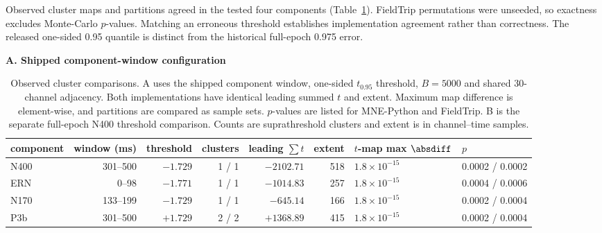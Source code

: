 Observed cluster maps and partitions agreed in the tested four components (Table~\ref*{tab:cluster}). FieldTrip permutations were unseeded, so exactness excludes Monte-Carlo \(p\)-values. Matching an erroneous threshold establishes implementation agreement rather than correctness. The released one-sided 0.95 quantile is distinct from the historical full-epoch 0.975 error.
\begin{table}[!htbp]
\centering\small
\caption{Observed cluster comparisons. A uses the shipped component window, one-sided \(t_{0.95}\) threshold, \(B=5000\) and shared 30-channel adjacency. Both implementations have identical leading summed \(t\) and extent. Maximum map difference is element-wise, and partitions are compared as sample sets. \(p\)-values are listed for MNE-Python and FieldTrip. B is the separate full-epoch N400 threshold comparison. Counts are suprathreshold clusters and extent is in channel--time samples.}
\label{tab:cluster}
\textbf{A. Shipped component-window configuration}\par\smallskip
\begin{tabular}{lrrrrrll}
\toprule
component & window (ms) & threshold & clusters & leading \(\sum t\) & extent & \(t\)-map max \(\absdiff\) & \(p\) \\
\midrule
N400 & 301--500 & \(-1.729\) & 1 / 1 & \(-2102.71\) & 518 & \(1.8\times10^{-15}\) & 0.0002 / 0.0002 \\
ERN & 0--98 & \(-1.771\) & 1 / 1 & \(-1014.83\) & 257 & \(1.8\times10^{-15}\) & 0.0004 / 0.0006 \\
N170 & 133--199 & \(-1.729\) & 1 / 1 & \(-645.14\) & 166 & \(1.8\times10^{-15}\) & 0.0002 / 0.0004 \\
P3b & 301--500 & \(+1.729\) & 2 / 2 & \(+1368.89\) & 415 & \(1.8\times10^{-15}\) & 0.0002 / 0.0004 \\
\bottomrule
\end{tabular}


\end{table}
